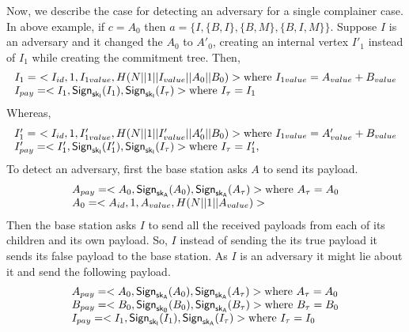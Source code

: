 		Now, we describe the case for detecting an adversary for a single complainer case.
		In above example, if $c = {A_{0}}$ then $a=\{I,\{B,I\},\{B,M\},\{B,I,M\}\}$.
		Suppose $I$ is an adversary and it changed the $A_{0}$ to $A'_{0}$, creating an internal vertex $I'_{1}$ instead of $I_{1}$ while creating the commitment tree. 
		Then,
		\begin{equation*}
			\begin{array}{l}
				I_{1} =\ <I_{id}, 1, I_{1value}, H(N||1||I_{value}||A_{0}||B_{0})> \mbox{where}\ I_{1value} = A_{value} + B_{value}\\	
				I_{pay} = <I_{1}, \textsf{Sign}_{\sf{sk}_{I}}(I_{1}), \textsf{Sign}_{\sf{sk}_{I}}(I_{\tau})> \mbox{where}\ I_{\tau} = I_{1}\\
			\end{array}
		\end{equation*}
		Whereas,
		\begin{equation*}
			\begin{array}{l}
				I'_{1} =\ <I_{id}, 1, I'_{1value}, H(N||1||I'_{value}||A'_{0}||B_{0})> \mbox{where}\ I_{1value} = A'_{value} + B_{value}\\
				I'_{pay} = <I'_{1}, \textsf{Sign}_{\sf{sk}_{I}}(I'_{1}), \textsf{Sign}_{\sf{sk}_{I}}(I_{\tau})> \mbox{where}\ I_{\tau} = I'_{1},\\
			\end{array}
		\end{equation*}
		To detect an adversary, first the base station asks $A$ to send its payload.
		\begin{equation*}
			\begin{array}{l}
			A_{pay} = <A_{0}, \textsf{Sign}_{\sf{sk}_{A}}(A_{0}), \textsf{Sign}_{\sf{sk}_{A}}(A_{\tau})> \mbox{where}\ A_{\tau} = A_{0}\\
			A_{0} = <A_{id}, 1, A_{value}, H(N||1||A_{value})>
			\end{array}
		\end{equation*}
		Then the base station asks $I$ to send all the received payloads from each of its children and its own payload.
		So, $I$ instead of sending the its true payload it sends its false payload to the base station.
		As $I$ is an adversary it might lie about it and send the following payload.
		\begin{equation*}
			\begin{array}{l}
				A_{pay} = <A_{0}, \textsf{Sign}_{\sf{sk}_{A}}(A_{0}), \textsf{Sign}_{\sf{sk}_{A}}(A_{\tau})> \mbox{where}\ A_{\tau} = A_{0}\\
				B_{pay} = <B_{0}, \textsf{Sign}_{\sf{sk}_{B}}(B_{0}), \textsf{Sign}_{\sf{sk}_{A}}(B_{\tau})> \mbox{where}\ B_{\tau} = B_{0}\\
				I_{pay} = <I_{1}, \textsf{Sign}_{\sf{sk}_{I}}(I_{1}), \textsf{Sign}_{\sf{sk}_{A}}(I_{\tau})> \mbox{where}\ I_{\tau} = I_{0}\\
			\end{array}
		\end{equation*}
